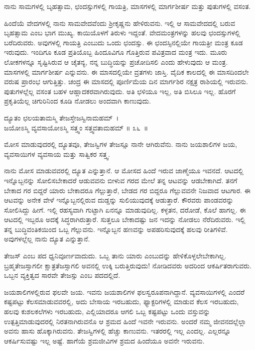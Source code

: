\begin{artha}
ನಾನು ಸಾಮಗಳಲ್ಲಿ ಬೃಹತ್ಸಾಮ, ಛಂದಸ್ಸುಗಳಲ್ಲಿ ಗಾಯತ್ರಿ, ಮಾಸಗಳಲ್ಲಿ ಮಾರ್ಗಶೀರ್ಷ ಮತ್ತು ಪುತುಗಳಲ್ಲಿ ವಸಂತ.
\end{artha}

ಹಿಂದೆಯೆ ವೇದಗಳಲ್ಲಿ ನಾನು ಸಾಮವೇದವೆಂದು ಶ‍್ರೀಕೃಷ್ಣನು ಹೇಳಿರುವನು. ಇಲ್ಲಿ ಆ ಸಾಮವೇದದಲ್ಲಿ ಬರುವ ಬೃಹತ್ಸಾಮ ಎಂಬ ಭಾಗ ಮುಖ್ಯ. ಕಾಯಿಯೊಳಗೆ ತಿರುಳು ಇದ್ದಂತೆ. ವೇದಮಂತ್ರಗಳನ್ನು ಹಲವು ಛಂದಸ್ಸುಗಳಲ್ಲಿ ಬರೆದಿರುವರು. ಅವುಗಳಲ್ಲಿ ಗಾಯತ್ರಿ ಎಂಬುದು ಒಂದು ಛಂದಸ್ಸು. ಈ ಛಂದಸ್ಸಿನಲ್ಲಿಯೇ ಗಾಯತ್ರೀ ಮಂತ್ರ ಕೂಡ ಇರುವುದು. ಇಂದಿಗೂ ಕೂಡ ಪ್ರತಿಯೊಬ್ಬ ಹಿಂದೂವಿಗೂ ಗೊತ್ತಿರುವ ಪವಿತ್ರವಾದ ಮಂತ್ರ ಇದು. ಮೂರು ಲೋಕಗಳನ್ನೂ ಸೃಷ್ಟಿಸಿರುವ ಆ ಚೈತನ್ಯ, ನನ್ನ ಬುದ್ಧಿಯನ್ನು ಪ್ರಚೋದಿಸಲಿ ಎಂದು ಹೇಳುವುದು ಆ ಮಂತ್ರ. ಮಾಸಗಳಲ್ಲಿ ಮಾರ್ಗಶೀರ್ಷ ಎನ್ನುವನು. ಈ ಮಾಸದಲ್ಲಿಯೇ ವ್ರತಗಳು ಜಾಸ್ತಿ. ವೈದಿಕ ಕಾಲದಲ್ಲಿ ಈ ಮಾಸದಿಂದಲೇ ವರುಷ ಪ್ರಾರಂಭ ಆಗುತ್ತಿತ್ತು. ಚಂದ್ರ ಈ ಮಾಸದಲ್ಲಿ ಪೂರ್ಣಿಮೆಯ ದಿನ ಮಾರ್ಗಶಿರ ನಕ್ಷತ್ರ ರಾಶಿಯಲ್ಲಿ ಇರುವನು. ಪುತುಗಳಲ್ಲೆಲ್ಲ ವಸಂತ ಬಹಳ ಆಹ್ಲಾದಕರವಾಗಿರುವುದು. ಅತಿ ಛಳಿಯೂ ಇಲ್ಲ, ಅತಿ ಬಿಸಿಲೂ ಇಲ್ಲ. ಹೊರಗೆ ಪ್ರಕೃತಿಯೆಲ್ಲ ಚಿಗುರಿನಿಂದ ಕೂಡಿ ನೋಡಲು ಅಂದವಾಗಿ ಕಾಣುವುದು.

\begin{shloka}
ದ್ಯೂತಂ ಛಲಯತಾಮಸ್ಮಿ ತೇಜಸ್ತೇಜಸ್ವಿನಾಮಹಮ್~।\\ಜಯೋಽಸ್ಮಿ ವ್ಯವಸಾಯೋಽಸ್ಮಿ ಸತ್ತ್ವಂ ಸತ್ತ್ವವತಾಮಹಮ್ \hfill॥ ೩೬~॥
\end{shloka}

\begin{artha}
ಮೋಸ ಮಾಡುವುದರಲ್ಲಿ ದ್ಯೂತವೂ, ತೇಜಸ್ವಿಗಳ ತೇಜಸ್ಸೂ ನಾನೇ ಆಗಿರುವೆನು. ನಾನು ಜಯಶಾಲಿಗಳ ಜಯ, ವ್ಯವಸಾಯಿಗಳ ವ್ಯವಸಾಯ ಮತ್ತು ಸಾತ್ವಿಕರ ಸತ್ತ್ವ.
\end{artha}

ನಾನು ಮೋಸ ಮಾಡುವವರಲ್ಲಿ ದ್ಯೂತ ಎನ್ನುತ್ತಾನೆ. ಆ ಮೋಸದ ಹಿಂದೆ ಇರುವ ಜಾಣ್ಮೆಯೂ ಇವನದೆ. ಆಟದಲ್ಲಿ ಇನ್ನೊಬ್ಬನನ್ನು ಸೋಲಿಸಬೇಕಾದರೆ ಆಡುವವನು ಬೀಳುವ ಗರದ ಮೇಲೆ ತನ್ನ ಆಟವನ್ನು ಆಡಬೇಕಾಗಿದೆ. ತನಗೆ ಬೇಕಾದ ಗರ ಬಿದ್ದರೆ ಯಾರು ಬೇಕಾದರೂ ಗೆಲ್ಲುತ್ತಾರೆ, ಬೇಡದ ಗರ ಬಿದ್ದರೂ ಗೆಲ್ಲುವವನೇ ನಿಜವಾದ ಆಟಗಾರ. ಈ ಆಟವನ್ನು ಅನೇಕ ವೇಳೆ ಇನ್ನೊಬ್ಬನಲ್ಲಿರುವ ದುಡ್ಡನ್ನು ಸುಲಿಯುವುದಕ್ಕೆ ಆಡುತ್ತಾರೆ. ಕೌರವರು ಪಾಂಡವರನ್ನು ಸೋಲಿಸಿದ್ದು ಹೀಗೆ. ಇಲ್ಲಿ ರಹಸ್ಯವಾಗಿ ಗುಟ್ಟಾಗಿ ಏನನ್ನೂ ಮಾಡುವುದಿಲ್ಲ. ಕಳ್ಳತನ, ದರೋಡೆ, ಕೊಲೆ ಹಾಗಲ್ಲ. ಈ ಆಟದಲ್ಲಿ ಇಬ್ಬರೂ ಅದಕ್ಕೆ ಸಿದ್ಧರಾಗಿರುತ್ತಾರೆ. ಸುತ್ತಲೂ ಬೇಕಾದಷ್ಟು ಜನ ಇದನ್ನು ನೋಡಲು ನೆರೆದಿರುವರು. ಇಲ್ಲಿ ತನ್ನ ಬುದ್ಧಿವಂತಿಕಯಿಂದ ಒಬ್ಬ ಗೆಲ್ಲುವನು. ಇನ್ನೊಬ್ಬನ ಹಣವನ್ನು ಅಪಹರಿಸುವುದಕ್ಕೆ ಹಲವು ರೀತಿಗಳಿವೆ. ಅವುಗಳಲ್ಲೆಲ್ಲ ನಾನು ದ್ಯೂತ ಎನ್ನುತ್ತಾನೆ. 

ತೇಜಸ್ ಎಂಬ ಪದ ಧ್ವನಿವೂರ್ಣವಾದುದು. ಒಬ್ಬ ತಾನು ಯಾರು ಎಂಬುದನ್ನು ಹೇಳಿ\-ಕೊಳ್ಳಲೇಬೇಕಾಗಿಲ್ಲ. ಬ್ರಹ್ಮತೇಜಸ್ಸಾಗಲೀ ಕ್ಷಾತ್ರತೆಜಸ್ಸಾಗಲಿ ಅವನಲ್ಲಿ ಉಕ್ಕಿ ಬರುತ್ತಿರುವುದು! ನೋಡಿದವರು ಅದರಿಂದ ಆಕರ್ಷಿತರಾಗುವರು. ಒಬ್ಬನ ವ್ಯಕ್ತಿತ್ವದ ಸಾರವೇ ತೇಜಸ್ಸು ಎಂಬ ಪದದಲ್ಲಿದೆ. 

ಜಯಶಾಲಿಗಳಲ್ಲಿರುವ ಫಲವೇ ಜಯ. ಇವನು ಜಯಶಾಲಿಗಳ ಫಲಸ್ವರೂಪನಾಗಿದ್ದಾನೆ. ವ್ಯವಸಾಯಿಗಳಲ್ಲಿ ಎಂದರೆ ಕಷ್ಟಪಟ್ಟು ಕೆಲಸಮಾಡುವವರಲ್ಲಿ, ಅದು ಬೇಸಾಯ ಇರಬಹುದು, ಫ್ಯಾಕ್ಟರಿಗಳಲ್ಲಿ ಮಾಡುವ ಕೆಲಸ ಇರಬಹುದು, ಹಲವು ಕುಶಲಕಲೆಗಳು ಇರಬಹುದು, ಎಲ್ಲಿಯಾದರೂ ಆಗಲಿ ಒಬ್ಬ ಕಷ್ಟಪಟ್ಟು ಒಂದು ವಸ್ತುವನ್ನು ಉತ್ಪತ್ತಿಮಾಡುವುದರಲ್ಲಿ ನಿರತನಾಗಿರುವನೊ ಆ ಶ್ರಮದ ಹಿಂದೆ ಇವನೇ ಇರುವನು. ಅಂದರೆ ನಮ್ಮ ಜೀವನದಲ್ಲೆಲ್ಲಾ ಅವನು ಹಾಸು ಹೊಕ್ಕಾಗಿರುವನು. ತೇಜಸ್ವಿಗಳಲ್ಲಿ ಹೆಚ್ಚು ಕಾಣುವನು. ಇತರರಲ್ಲಿ ಇಲ್ಲ ಎಂದಲ್ಲ. ಎಲ್ಲರನ್ನೂ ಆಕರ್ಷಿಸುವಷ್ಟು ಇಲ್ಲ ಅಷ್ಟೆ. ಹಾಗೆಯೆ ಶ್ರಮಜೀವಿಗಳ ಶ್ರಮದ ಹಿಂದೆಯೂ ಅವನೇ ಇರುವನು.

